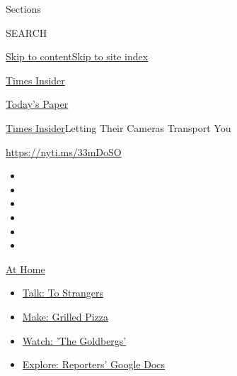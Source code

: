 Sections

SEARCH

\protect\hyperlink{site-content}{Skip to
content}\protect\hyperlink{site-index}{Skip to site index}

\href{https://www.nytimes3xbfgragh.onion/section/reader-center}{Times
Insider}

\href{https://myaccount.nytimes3xbfgragh.onion/auth/login?response_type=cookie\&client_id=vi}{}

\href{https://www.nytimes3xbfgragh.onion/section/todayspaper}{Today's
Paper}

\href{/section/reader-center}{Times Insider}\textbar{}Letting Their
Cameras Transport You

\url{https://nyti.ms/33mDoSO}

\begin{itemize}
\item
\item
\item
\item
\item
\item
\end{itemize}

\href{https://www.nytimes3xbfgragh.onion/spotlight/at-home?action=click\&pgtype=Article\&state=default\&region=TOP_BANNER\&context=at_home_menu}{At
Home}

\begin{itemize}
\tightlist
\item
  \href{https://www.nytimes3xbfgragh.onion/2020/08/03/well/family/the-benefits-of-talking-to-strangers.html?action=click\&pgtype=Article\&state=default\&region=TOP_BANNER\&context=at_home_menu}{Talk:
  To Strangers}
\item
  \href{https://www.nytimes3xbfgragh.onion/2020/08/01/at-home/coronavirus-make-pizza-on-a-grill.html?action=click\&pgtype=Article\&state=default\&region=TOP_BANNER\&context=at_home_menu}{Make:
  Grilled Pizza}
\item
  \href{https://www.nytimes3xbfgragh.onion/2020/07/31/arts/television/goldbergs-abc-stream.html?action=click\&pgtype=Article\&state=default\&region=TOP_BANNER\&context=at_home_menu}{Watch:
  'The Goldbergs'}
\item
  \href{https://www.nytimes3xbfgragh.onion/interactive/2020/at-home/even-more-reporters-editors-diaries-lists-recommendations.html?action=click\&pgtype=Article\&state=default\&region=TOP_BANNER\&context=at_home_menu}{Explore:
  Reporters' Google Docs}
\end{itemize}

